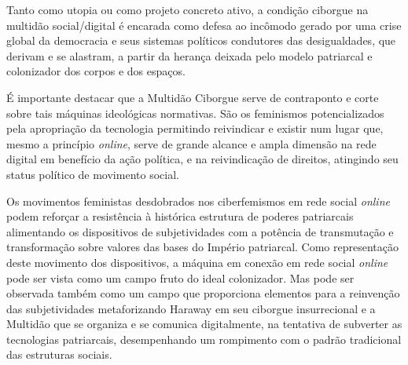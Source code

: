 Tanto como utopia ou como projeto concreto ativo, a condição ciborgue na
multidão social/digital é encarada como defesa ao incômodo gerado por
uma crise global da democracia e seus sistemas políticos condutores das
desigualdades, que derivam e se alastram, a partir da herança deixada
pelo modelo patriarcal e colonizador dos corpos e dos espaços.

É importante destacar que a Multidão Ciborgue serve de contraponto e
corte sobre tais máquinas ideológicas normativas. São os feminismos
potencializados pela apropriação da tecnologia permitindo reivindicar e
existir num lugar que, mesmo a princípio \emph{online}, serve de grande
alcance e ampla dimensão na rede digital em benefício da ação política,
e na reivindicação de direitos, atingindo seu status político de
movimento social.

Os movimentos feministas desdobrados nos ciberfemismos em rede social
\emph{online} podem reforçar a resistência à histórica estrutura de poderes
patriarcais alimentando os dispositivos de subjetividades com a potência
de transmutação e transformação sobre valores das bases do Império
patriarcal. Como representação deste movimento dos dispositivos, a
máquina em conexão em rede social \emph{online} pode ser vista como um campo
fruto do ideal colonizador. Mas pode ser observada também como um campo
que proporciona elementos para a reinvenção das subjetividades
metaforizando Haraway em seu ciborgue insurrecional e a Multidão que se
organiza e se comunica digitalmente, na tentativa de subverter as
tecnologias patriarcais, desempenhando um rompimento com o padrão
tradicional das estruturas sociais.

